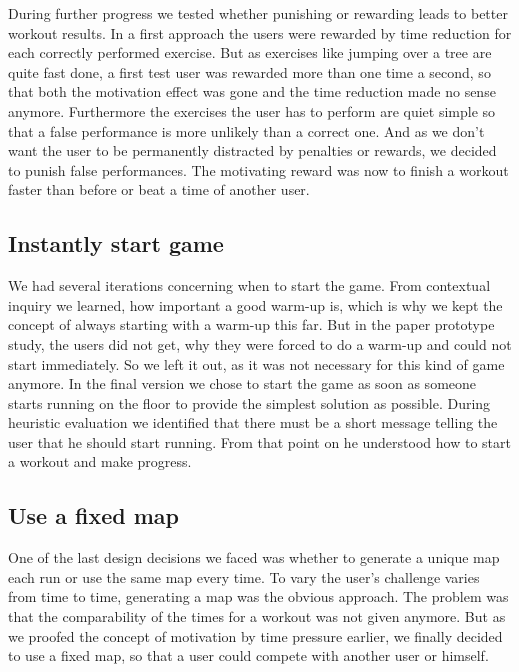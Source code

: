 \documentclass{sigchi}
\begin{document}
    During further progress we tested whether punishing or rewarding leads to better workout results. In a first approach the users were rewarded by time reduction for each correctly performed exercise. But as exercises like jumping over a tree are quite fast done, a first test user was rewarded more than one time a second, so that both the motivation effect was gone and the time reduction made no sense anymore. Furthermore the exercises the user has to perform are quiet simple so that a false performance is more unlikely than a correct one. And as we don't want the user to be permanently distracted by penalties or rewards, we decided to punish false performances. The motivating reward was now to finish a workout faster than before or beat a time of another user.

  \subsection{Instantly start game } %
  \label{sub:instantly_start_game_}

    We had several iterations concerning when to start the game. From contextual inquiry we learned, how important a good warm-up is, which is why we kept the concept of always starting with a warm-up this far. But in the paper prototype study, the users did not get, why they were forced to do a warm-up and could not start immediately. So we left it out, as it was not necessary for this kind of game anymore. In the final version we chose to start the game as soon as someone starts running on the floor to provide the simplest solution as possible. During heuristic evaluation we identified that there must be a short message telling the user that he should start running. From that point on he understood how to start a workout and make progress.

  \subsection{Use a fixed map} %
  \label{sub:use_a_fixed_map}

    One of the last design decisions we faced was whether to generate a unique map each run or use the same map every time. To vary the user's challenge varies from time to time, generating a map was the obvious approach. The problem was that the comparability of the times for a workout was not given anymore. But as we proofed the concept of motivation by time pressure earlier, we finally decided to use a fixed map, so that a user could compete with another user or himself.
\end{document}
